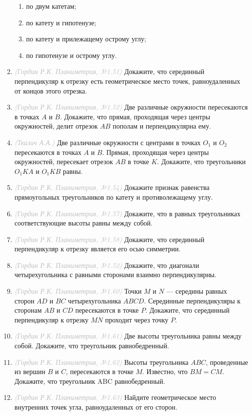 \documentclass[10pt, a4paper]{article}
\newcommand{\source}[1]{\textcolor{silver}{\textit{(#1)}}}
\begin{document}
\begin{enumerate}
\begin{enumerate}[label=\asbuk*)]
			\item по двум катетам;
			\item по катету и гипотенузе;
			\item по катету и прилежащему острому углу;
			\item по гипотенузе и острому углу.
		\end{enumerate}
		\item \source{Гордин Р.К. Планиметрия, №1.51} Докажите, что серединный перпендикуляр к отрезку есть геометрическое место точек, равноудаленных от концов этого отрезка.
		\item \source{Гордин Р.К. Планиметрия, №1.52} Две различные окружности пересекаются в точках $A$ и $B$. Докажите, что прямая, проходящая через центры окружностей, делит отрезок $AB$ пополам и перпендикулярна ему.
		\item \source{Ткалич А.А.} Две различные окружности с центрами в точках $O_1$ и $O_2$ пересекаются в точках $A$ и $B$. Прямая, проходящая через центры окружностей, пересекает отрезок $AB$ в точке $K$. Докажите, что треугольники $O_1KA$ и $O_1KB$ равны.
		\item \source{Гордин Р.К. Планиметрия, №1.54} Докажите признак равенства прямоугольных треугольников по катету и противолежащему углу.
		\item \source{Гордин Р.К. Планиметрия, №1.57} Докажите, что в равных треугольниках соответствующие высоты равны между собой.
		\item \source{Гордин Р.К. Планиметрия, №1.58} Докажите, что серединный перпендикуляр к отрезку является его осью симметрии.
		\item \source{Гордин Р.К. Планиметрия, №1.52} Докажите, что диагонали четырехугольника с равными сторонами взаимно перпендикулярны.
		\item \source{Гордин Р.К. Планиметрия, №1.60} Точки $M$ и $N$ --- середины равных сторон $AD$ и $BC$ четырехугольника $ABCD$. Серединные перпендикуляры к сторонам $AB$ и $CD$ пересекаются в точке $P$. Докажите, что серединный перпендикуляр к отрезку $MN$ проходит через точку $P$.
		\item \source{Гордин Р.К. Планиметрия, №1.61} Две высоты треугольника равны между собой. Докажите, что треугольник равнобедренный.
		\item \source{Гордин Р.К. Планиметрия, №1.62} Высоты треугольника $ABC$, проведенные из вершин $B$ и $C$, пересекаются в точке $M$. Известно, что $BM = CM$. Докажите, что треугольник ABC равнобедренный.
		\item \source{Гордин Р.К. Планиметрия, №1.63} Найдите геометрическое место внутренних точек угла, равноудаленных от его сторон.

\end{enumerate}
\end{document}
